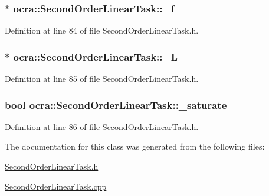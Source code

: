 \subsubsection[{\texorpdfstring{\+\_\+f}{_f}}]{$\ast$ ocra\+::\+Second\+Order\+Linear\+Task\+::\+\_\+f\hspace{0.3cm}{\ttfamily [protected]}}\hypertarget{classocra_1_1SecondOrderLinearTask_a55c45007880f6ba1936bc9b4601dc58e}{}\label{classocra_1_1SecondOrderLinearTask_a55c45007880f6ba1936bc9b4601dc58e}


Definition at line 84 of file Second\+Order\+Linear\+Task.\+h.

\subsubsection[{\texorpdfstring{\+\_\+L}{_L}}]{$\ast$ ocra\+::\+Second\+Order\+Linear\+Task\+::\+\_\+L\hspace{0.3cm}{\ttfamily [protected]}}\hypertarget{classocra_1_1SecondOrderLinearTask_a386a6daf02add8b19a69e1aa411c63af}{}\label{classocra_1_1SecondOrderLinearTask_a386a6daf02add8b19a69e1aa411c63af}


Definition at line 85 of file Second\+Order\+Linear\+Task.\+h.

\subsubsection[{\texorpdfstring{\+\_\+saturate}{_saturate}}]{\setlength{\rightskip}{0pt plus 5cm}bool ocra\+::\+Second\+Order\+Linear\+Task\+::\+\_\+saturate\hspace{0.3cm}{\ttfamily [protected]}}\hypertarget{classocra_1_1SecondOrderLinearTask_a0d433a32e0892bdf98d3b15325b6917e}{}\label{classocra_1_1SecondOrderLinearTask_a0d433a32e0892bdf98d3b15325b6917e}


Definition at line 86 of file Second\+Order\+Linear\+Task.\+h.



The documentation for this class was generated from the following files\+:\begin{DoxyCompactItemize}
\item 
\hyperlink{SecondOrderLinearTask_8h}{Second\+Order\+Linear\+Task.\+h}\item 
\hyperlink{SecondOrderLinearTask_8cpp}{Second\+Order\+Linear\+Task.\+cpp}\end{DoxyCompactItemize}
